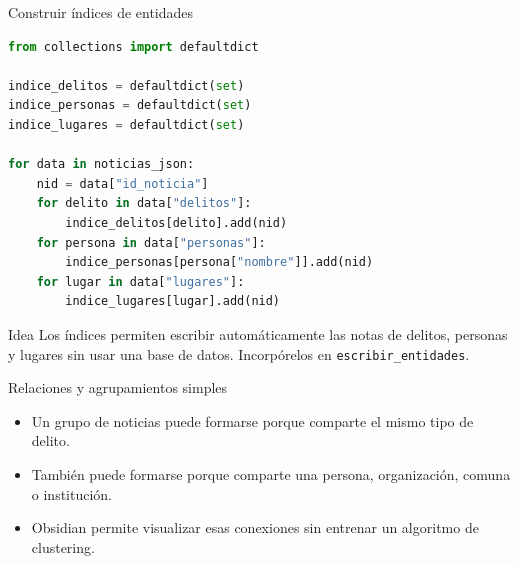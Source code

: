 \documentclass[11pt,aspectratio=169]{beamer}
\newcommand{\code}[1]{\texttt{#1}}
\begin{document}
\begin{frame}[fragile]{Construir índices de entidades}
\tiny
\begin{lstlisting}[language=Python]
from collections import defaultdict

indice_delitos = defaultdict(set)
indice_personas = defaultdict(set)
indice_lugares = defaultdict(set)

for data in noticias_json:
    nid = data["id_noticia"]
    for delito in data["delitos"]:
        indice_delitos[delito].add(nid)
    for persona in data["personas"]:
        indice_personas[persona["nombre"]].add(nid)
    for lugar in data["lugares"]:
        indice_lugares[lugar].add(nid)
\end{lstlisting}

\scriptsize
\begin{block}{Idea}
Los índices permiten escribir automáticamente las notas de delitos, personas y lugares sin usar una base de datos. Incorpórelos en \code{escribir\_entidades}.
\end{block}
\end{frame}

\begin{frame}{Relaciones y agrupamientos simples}
\small
\begin{itemize}[<+->]
\item Un grupo de noticias puede formarse porque comparte el mismo tipo de delito.
\item También puede formarse porque comparte una persona, organización, comuna o institución.
\item Obsidian permite visualizar esas conexiones sin entrenar un algoritmo de clustering.
\end{itemize}

\begin{center}
\end{center}
\end{frame}
\end{document}
